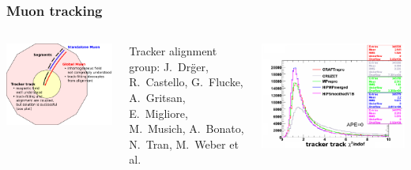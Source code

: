 \documentclass[compress]{beamer}
\begin{document}
\begin{frame}
\frametitle{Muon tracking}

\begin{columns}
\includegraphics[width=\linewidth]{muon_tracks.png}

\hfill \begin{minipage}{0.8\linewidth}
\tiny Tracker alignment group: J.\ Dr\"ger, R.\ Castello, G.\ Flucke, A.\ Gritsan, E.\ Migliore, M.\ Musich, A.\ Bonato, N.\ Tran, M.\ Weber et al.
\end{minipage}

\includegraphics[width=\linewidth]{tracker_chi2.png}
\end{columns}


\end{frame}
\end{document}
